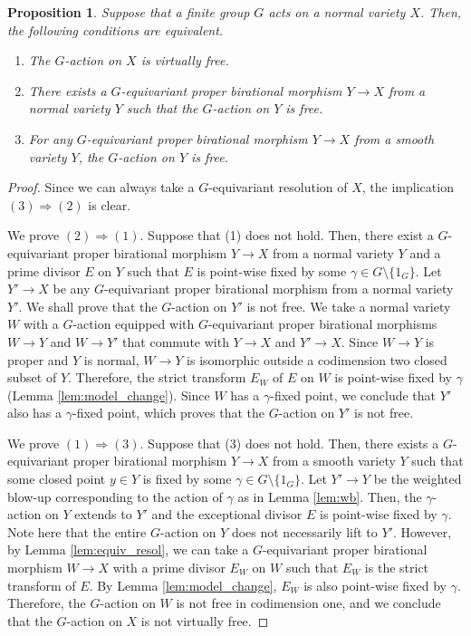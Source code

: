 \documentclass[a4paper,11pt]{amsart}
\newtheorem{prop}[thm]{Proposition}
\theoremstyle{definition}
\theoremstyle{remark}
\begin{document}
\begin{prop}\label{prop:char}
Suppose that a finite group $G$ acts on a normal variety $X$. 
Then, the following conditions are equivalent. 
\begin{enumerate}
\item 
The $G$-action on $X$ is virtually free. 

\item
There exists a $G$-equivariant proper birational morphism $Y \to X$ from a normal variety $Y$ such that the $G$-action on $Y$ is free.  

\item
For any $G$-equivariant proper birational morphism $Y \to X$ from a smooth variety $Y$, the $G$-action on $Y$ is free. 
\end{enumerate}
\end{prop}
\begin{proof}
Since we can always take a $G$-equivariant resolution of $X$, the implication $(3) \Rightarrow (2)$ is clear. 

We prove $(2) \Rightarrow (1)$. 
Suppose that (1) does not hold. 
Then, there exist a $G$-equivariant proper birational morphism $Y \to X$ from a normal variety $Y$ 
and a prime divisor $E$ on $Y$ such that $E$ is point-wise fixed by some $\gamma \in G \setminus \{ 1_G \}$. 
Let $Y' \to X$ be any $G$-equivariant proper birational morphism from a normal variety $Y'$. 
We shall prove that the $G$-action on $Y'$ is not free.  
We take a normal variety $W$ with a $G$-action equipped with $G$-equivariant proper birational morphisms $W \to Y$ and $W \to Y'$ that commute with $Y \to X$ and $Y' \to X$. 
Since $W \to Y$ is proper and $Y$ is normal, $W \to Y$ is isomorphic outside a codimension two closed subset of $Y$. 
Therefore, the strict transform $E_W$ of $E$ on $W$ is point-wise fixed by $\gamma$ (Lemma \ref{lem:model_change}). 
Since $W$ has a $\gamma$-fixed point, we conclude that $Y'$ also has a $\gamma$-fixed point, which proves that the $G$-action on $Y'$ is not free. 

We prove $(1) \Rightarrow (3)$.
Suppose that (3) does not hold. 
Then, there exists a $G$-equivariant proper birational morphism $Y \to X$ from a smooth variety $Y$ such that 
some closed point $y \in Y$ is fixed by some $\gamma \in G \setminus \{ 1_G \}$. 
Let $Y' \to Y$ be the weighted blow-up corresponding to the action of $\gamma$ as in Lemma \ref{lem:wb}. 
Then, the $\gamma$-action on $Y$ extends to $Y'$ and the exceptional divisor $E$ is point-wise fixed by $\gamma$. 
Note here that the entire $G$-action on $Y$ does not necessarily lift to $Y'$. 
However, by Lemma \ref{lem:equiv_resol}, we can take a $G$-equivariant proper birational morphism $W \to X$ with a prime divisor $E_W$ on $W$ such that $E_W$ is the strict transform of $E$. 
By Lemma \ref{lem:model_change}, $E_W$ is also point-wise fixed by $\gamma$. 
Therefore, the $G$-action on $W$ is not free in codimension one, 
and we conclude that the $G$-action on $X$ is not virtually free. 
\end{proof}
\end{document}
